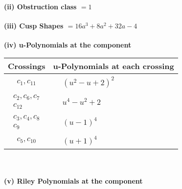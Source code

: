 \documentclass[1p]{elsarticle_modified}
\theoremstyle{definition}
\begin{document}
\flushleft \textbf{(ii) Obstruction class $= 1$}\\~\\
\flushleft \textbf{(iii) Cusp Shapes $= 16 a^3+8 a^2+32 a-4$}\\~\\
\newpage\renewcommand{\arraystretch}{1}
\flushleft \textbf{(iv) u-Polynomials at the component}\newline \\
\begin{tabular}{m{50pt}|m{274pt}}
Crossings & \hspace{64pt}u-Polynomials at each crossing \\
\hline $$\begin{aligned}c_{1},c_{11}\end{aligned}$$&$\begin{aligned}
&(u^2- u+2)^2
\end{aligned}$\\
\hline $$\begin{aligned}c_{2},c_{6},c_{7}\\c_{12}\end{aligned}$$&$\begin{aligned}
&u^4- u^2+2
\end{aligned}$\\
\hline $$\begin{aligned}c_{3},c_{4},c_{8}\\c_{9}\end{aligned}$$&$\begin{aligned}
&(u-1)^4
\end{aligned}$\\
\hline $$\begin{aligned}c_{5},c_{10}\end{aligned}$$&$\begin{aligned}
&(u+1)^4
\end{aligned}$\\
\hline
\end{tabular}\\~\\
\newpage\renewcommand{\arraystretch}{1}
\flushleft \textbf{(v) Riley Polynomials at the component}\newline \\
\end{document}
